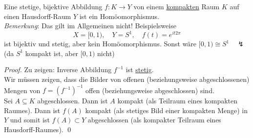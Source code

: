 \begin{theorem}
  Eine stetige, bijektive Abbildung \( f : K \to Y \) von einem \hyperref[def:kompakt]{kompakten} Raum \( K \) auf einen Hausdorff-Raum \( Y \) ist ein Homöomorphismus. \\
  \emph{Bemerkung}: Das gilt im Allgemeinen nicht! Beispielsweise
  \begin{equation*}
    X = [0,1), \quad Y = S^1, \quad f(t) = e^{it2\pi}
  \end{equation*}
  ist bijektiv und stetig, aber kein Homöomorphismus. Sonst wäre \( [0,1) \cong S^1 \quad \lightning \) (da \( S^1 \) kompakt ist, aber \( [0,1) \) nicht)
  \begin{proof}
    Zu zeigen: Inverse Abbildung \( f^{-1} \) ist \hyperref[def:stetig]{stetig}. \\
    Wir müssen zeigen, dass die Bilder von offenen (beziehungsweise abgeschlossenen) Mengen von \( f = {\left( f^{-1} \right)}^{-1} \) offen (beziehungsweise abgeschlossen) sind. \\
    Sei \( A \subseteq K \) abgeschlossen. Dann ist \( A \) kompakt (als Teilraum eines kompakten Raumes). Dann ist \( f(A) \) kompakt (als stetiges Bild einer kompakten Menge) in \( Y \) und somit ist \( f(A) \subset Y \) abgeschlossen (als kompakter Teilraum eines Hausdorff-Raumes). \qed{}
  \end{proof}
\end{theorem}
